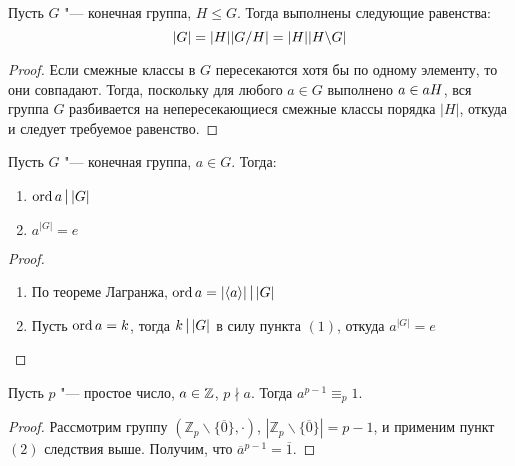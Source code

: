     \begin{theorem}[Лагранжа]
    	Пусть $G$ "--- конечная группа, $H \le G$. Тогда выполнены следующие равенства:
    	\[|G| = |H||G / H| \hm= |H||H \bs G|\]
    \end{theorem}
    
    \begin{proof}
    	Если смежные классы в $G$ пересекаются хотя бы по одному элементу, то они совпадают. Тогда, поскольку для любого $a \in G$ выполнено $a \hm\in aH$, вся группа $G$ разбивается на непересекающиеся смежные классы порядка $|H|$, откуда и следует требуемое равенство.
    \end{proof}
    
    \begin{corollary}
    	Пусть $G$ "--- конечная группа, $a \in G$. Тогда:
    	\begin{enumerate}
    		\item $\ord{a} \Mid |G|$
    		\item $a^{|G|} = e$
    	\end{enumerate}
    \end{corollary}
    
    \begin{proof}~
    	\begin{enumerate}
    		\item По теореме Лагранжа, $\ord{a} = |\langle a\rangle| \Mid |G|$
    		\item Пусть $\operatorname{ord}{a} = k$, тогда $k \Mid |G|$ в силу пункта $(1)$, откуда $a^{|G|} = e$\qedhere
    	\end{enumerate}
    \end{proof}
    
    \begin{corollary}
    	Пусть $p$ "--- простое число, $a \in \mathbb{Z}$, $p \nmid a$. Тогда $a^{p-1} \equiv_p 1$.
    \end{corollary}
    
    \begin{proof}
    	Рассмотрим группу $(\mathbb{Z}_p\backslash\{\overline{0}\}, \cdot)$, $|\mathbb{Z}_p\backslash\{\overline{0}\}| = p - 1$, и применим пункт $(2)$ следствия выше. Получим, что $\overline{a}^{p - 1} = \overline{1}$.
    \end{proof}